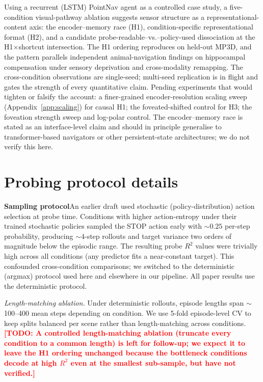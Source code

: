 \documentclass{article}
\newcommand{\TODO}[1]{\textcolor{red}{\textbf{[TODO: #1]}}}
\begin{document}
Using a recurrent (LSTM) PointNav agent as a controlled case study, a five-condition visual-pathway ablation suggests sensor structure as a representational-content axis: the encoder--memory race (H1), condition-specific representational format (H2), and a candidate probe-readable--vs.--policy-used dissociation at the H1$\times$shortcut intersection. The H1 ordering reproduces on held-out MP3D, and the pattern parallels independent animal-navigation findings on hippocampal compensation under sensory deprivation and cross-modality remapping. The cross-condition observations are single-seed; multi-seed replication is in flight and gates the strength of every quantitative claim. Pending experiments that would tighten or falsify the account: a finer-grained encoder-resolution scaling sweep (Appendix~\ref{app:scaling}) for causal H1; the foveated-shifted control for H3; the foveation strength sweep and log-polar control. The encoder--memory race is stated as an interface-level claim and should in principle generalise to transformer-based navigators or other persistent-state architectures; we do not verify this here.





\newpage


\newpage
\appendix

\section{Probing protocol details}
\label{app:probing-details}

\noindent\textbf{Sampling protocol}\quad An earlier draft used stochastic (policy-distribution) action selection at probe time. Conditions with higher action-entropy under their trained stochastic policies sampled the STOP action early with $\sim 0.25$ per-step probability, producing $\sim 4$-step rollouts and target variance two orders of magnitude below the episodic range. The resulting probe $R^2$ values were trivially high across all conditions (any predictor fits a near-constant target). This confounded cross-condition comparisons; we switched to the deterministic (argmax) protocol used here and elsewhere in our pipeline. All paper results use the deterministic protocol.

\emph{Length-matching ablation.} Under deterministic rollouts, episode lengths span $\sim$100--400 mean steps depending on condition. We use 5-fold episode-level CV to keep splits balanced per scene rather than length-matching across conditions. \TODO{A controlled length-matching ablation (truncate every condition to a common length) is left for follow-up; we expect it to leave the H1 ordering unchanged because the bottleneck conditions decode at high $R^2$ even at the smallest sub-sample, but have not verified.}
\end{document}

